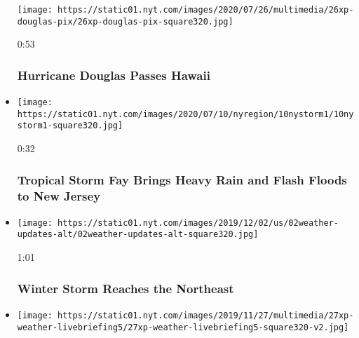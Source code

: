 \begin{itemize}
  \texttt{[image: https://static01.nyt.com/images/2020/07/26/multimedia/26xp-douglas-pix/26xp-douglas-pix-square320.jpg]}

  0:53

  \hypertarget{hurricane-douglas-passes-hawaii}{%
  \subsubsection{Hurricane Douglas Passes
  Hawaii}\label{hurricane-douglas-passes-hawaii}}
\item
  \href{https://www.nytimes.com/video/us/100000007233406/tropical-storm-fay-brings-heavy-rain-and-flash-floods-to-new-jersey.html?action=click\&module=video-series-bar\&region=header\&pgtype=Article\&playlistId=video/extreme-weather}{}

  \texttt{[image: https://static01.nyt.com/images/2020/07/10/nyregion/10nystorm1/10nystorm1-square320.jpg]}

  0:32

  \hypertarget{tropical-storm-fay-brings-heavy-rain-and-flash-floods-to-new-jersey}{%
  \subsubsection{Tropical Storm Fay Brings Heavy Rain and Flash Floods
  to New
  Jersey}\label{tropical-storm-fay-brings-heavy-rain-and-flash-floods-to-new-jersey}}
\item
  \href{https://www.nytimes.com/video/us/100000006853962/winter-storm-northeast.html?action=click\&module=video-series-bar\&region=header\&pgtype=Article\&playlistId=video/extreme-weather}{}

  \texttt{[image: https://static01.nyt.com/images/2019/12/02/us/02weather-updates-alt/02weather-updates-alt-square320.jpg]}

  1:01

  \hypertarget{winter-storm-reaches-the-northeast}{%
  \subsubsection{Winter Storm Reaches the
  Northeast}\label{winter-storm-reaches-the-northeast}}
\item
  \href{https://www.nytimes.com/video/us/100000006848528/thanksgiving-storms.html?action=click\&module=video-series-bar\&region=header\&pgtype=Article\&playlistId=video/extreme-weather}{}

  \texttt{[image: https://static01.nyt.com/images/2019/11/27/multimedia/27xp-weather-livebriefing5/27xp-weather-livebriefing5-square320-v2.jpg]}


\end{itemize}
